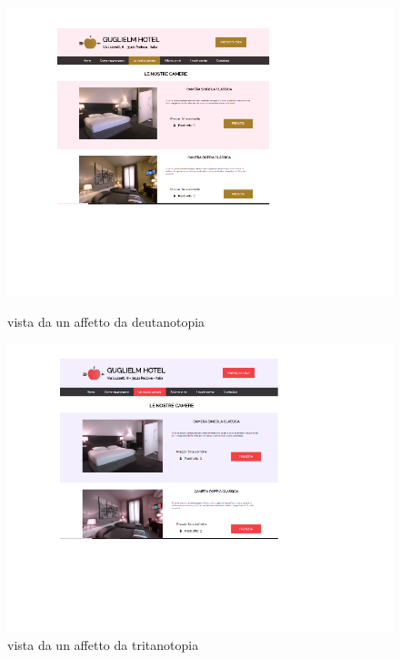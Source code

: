 \begin{figure}[htbp]
	\centering
	\begin{minipage}[c]{.40\textwidth}
		\includegraphics[width=.70\textwidth]{../templates/_Immagini/deut.png}
		\caption{vista da un affetto da deutanotopia}
	\end{minipage}%
	\hspace{10mm}%
	\begin{minipage}[c]{.40\textwidth}
		\includegraphics[width=.70\textwidth]{../templates/_Immagini/trita.png}
		\caption{vista da un affetto da tritanotopia}
	\end{minipage}
\end{figure}



